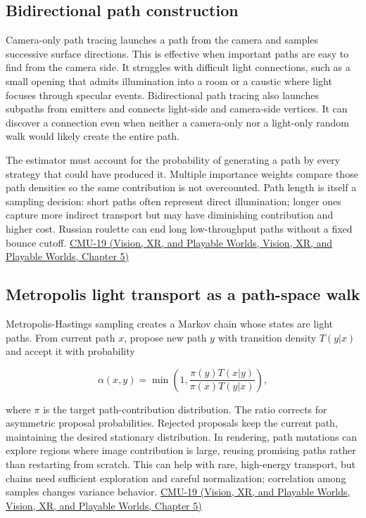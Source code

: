 \subsection{Bidirectional path construction}\label{03-visual-computing-i-ch011-bidirectional-path-construction}

Camera-only path tracing launches a path from the camera and samples successive surface directions. This is effective when important paths are easy to find from the camera side. It struggles with difficult light connections, such as a small opening that admits illumination into a room or a caustic where light focuses through specular events. Bidirectional path tracing also launches subpaths from emitters and connects light-side and camera-side vertices. It can discover a connection even when neither a camera-only nor a light-only random walk would likely create the entire path.

The estimator must account for the probability of generating a path by every strategy that could have produced it. Multiple importance weights compare those path densities so the same contribution is not overcounted. Path length is itself a sampling decision: short paths often represent direct illumination; longer ones capture more indirect transport but may have diminishing contribution and higher cost. Russian roulette can end long low-throughput paths without a fixed bounce cutoff. \href{../07-Vision-XR-and-Playable-Worlds/main.pdf\#nameddest=04-visual-computing-ii-ch036-cmu-19---variance-reduction}{CMU-19 (Vision, XR, and Playable Worlds, Vision, XR, and Playable Worlds, Chapter 5)}

\subsection{Metropolis light transport as a path-space walk}\label{03-visual-computing-i-ch011-metropolis-light-transport-as-a-path-space-walk}

Metropolis-Hastings sampling creates a Markov chain whose states are light paths. From current path \(x\), propose new path \(y\) with transition density \(T(y|x)\) and accept it with probability

\[
\alpha(x,y)=\min\left(1,\frac{\pi(y)T(x|y)}{\pi(x)T(y|x)}\right),
\]

where \(\pi\) is the target path-contribution distribution. The ratio corrects for asymmetric proposal probabilities. Rejected proposals keep the current path, maintaining the desired stationary distribution. In rendering, path mutations can explore regions where image contribution is large, reusing promising paths rather than restarting from scratch. This can help with rare, high-energy transport, but chains need sufficient exploration and careful normalization; correlation among samples changes variance behavior. \href{../07-Vision-XR-and-Playable-Worlds/main.pdf\#nameddest=04-visual-computing-ii-ch036-cmu-19---variance-reduction}{CMU-19 (Vision, XR, and Playable Worlds, Vision, XR, and Playable Worlds, Chapter 5)}

